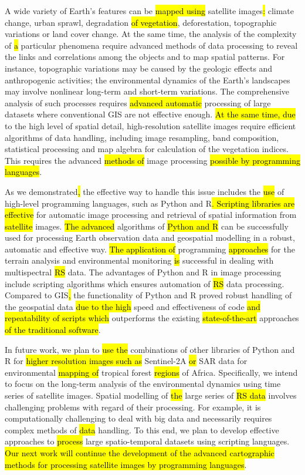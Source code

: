 \documentclass[jimaging,article,submit,pdftex,moreauthors]{Definitions/mdpi}
\begin{document}
A wide variety of Earth's features can be \hl{mapped using} satellite images\hl{: }climate change, urban sprawl, degradation \hl{of vegetation}, deforestation, topographic variations\hl{ }or land cover change. At the same time, the analysis of the complexity of \hl{a} particular\hl{ }phenomena require advanced methods of data processing to reveal the links and correlations among the objects and to map spatial patterns. For instance, topographic variations\hl{ }may be caused by the geologic effects and anthropogenic activities; the environmental dynamics of the Earth's landscapes may involve nonlinear long-term and short-term variations. The comprehensive analysis of such processes requires \hl{advanced automatic} processing of large datasets where conventional GIS are not effective enough. \hl{At the same time, due} to the high level of spatial detail, high-resolution satellite images require efficient algorithms of data handling, including image resampling, band composition, statistical processing and map algebra for calculation of the vegetation indices. This requires the advanced \hl{methods of} image processing \hl{possible by programming languages}.

As we demonstrated\hl{, }the effective way to handle this issue includes the \hl{use} of high-level programming languages, such as Python and R\hl{. Scripting libraries are effective }for automatic image processing and retrieval of spatial information from \hl{satellite} images. \hl{The advanced }algorithms of \hl{Python and R} can be successfully used for processing Earth observation data and geospatial modelling in a robust, automatic and effective way. \hl{The application of }programming \hl{approaches} for the terrain analysis and environmental monitoring \hl{is} successful in dealing with\hl{ }multispectral \hl{RS} data. The advantages of Python and R in image processing include\hl{ }scripting algorithms which ensures automation of \hl{RS} data processing.\hl{ }Compared to\hl{ }GIS\hl{,} the functionality of Python and R\hl{ }proved\hl{ }robust handling of the geospatial data\hl{ due to the high }speed and effectiveness of code\hl{ and repeatability of scripts which} outperforms\hl{ }the existing\hl{ state-of-the-art }approaches \hl{of the traditional software}. 

In future work, we plan to \hl{use the} combinations of other libraries of Python and R for \hl{higher resolution images such as} Sentinel-2A \hl{or} SAR data for\hl{ }environmental \hl{mapping of} tropical forest \hl{regions} of Africa. Specifically, we intend to focus on the long-term analysis of the environmental dynamics using time series of satellite images. Spatial modelling of \hl{the} large series of \hl{RS data} involves\hl{ }challenging problems with regard of their processing. For example, it is computationally challenging to deal with big data and necessarily requires complex methods of \hl{data} handling. To this end, we plan to develop effective approaches to\hl{ process }large spatio-temporal datasets using scripting languages.\hl{ Our next work will continue the development of the advanced cartographic methods for processing satellite images by programming languages}.
\end{document}
